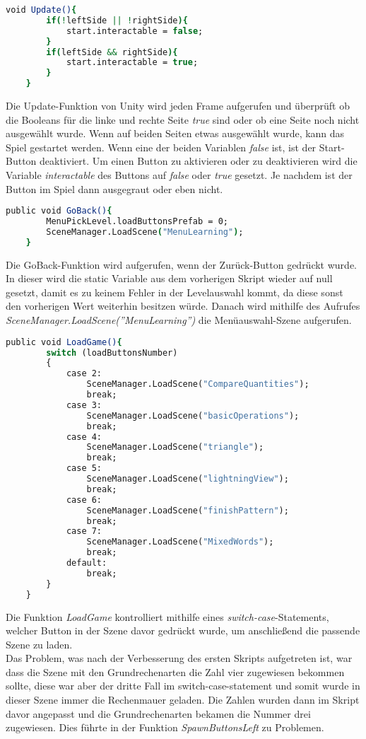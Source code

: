 \begin{lstlisting}[language=csh, caption={MenuPickLevelAdvanced.cs Update-Funktion}]
	void Update(){
		if(!leftSide || !rightSide){
			start.interactable = false;
		}
		if(leftSide && rightSide){
			start.interactable = true;
		}
	}
\end{lstlisting}
Die Update-Funktion von Unity wird jeden Frame aufgerufen und überprüft ob die Booleans für die linke und rechte Seite \textit{true} sind oder ob eine Seite noch nicht ausgewählt wurde. Wenn auf beiden Seiten etwas ausgewählt wurde, kann das Spiel gestartet werden. Wenn eine der beiden Variablen \textit{false} ist, ist der Start-Button deaktiviert. Um einen Button zu aktivieren oder zu deaktivieren wird die Variable \textit{interactable} des Buttons auf \textit{false} oder \textit{true} gesetzt. Je nachdem ist der Button im Spiel dann ausgegraut oder eben nicht.\\
\begin{lstlisting}[language=csh, caption={MenuPickLevelAdvanced.cs GoBack-Funktion}]
	public void GoBack(){
		MenuPickLevel.loadButtonsPrefab = 0;
		SceneManager.LoadScene("MenuLearning");
	}
\end{lstlisting}
Die GoBack-Funktion wird aufgerufen, wenn der Zurück-Button gedrückt wurde. In dieser wird die static Variable aus dem vorherigen Skript wieder auf null gesetzt, damit es zu keinem Fehler in der Levelauswahl kommt, da diese sonst den vorherigen Wert weiterhin besitzen würde. Danach wird mithilfe des Aufrufes \textit{SceneManager.LoadScene(''MenuLearning'')} die Menüauswahl-Szene aufgerufen.
\begin{lstlisting}[language=csh, caption={MenuPickLevelAdvanced.cs LoadGame-Funktion}]
	public void LoadGame(){
		switch (loadButtonsNumber)
		{
			case 2:
				SceneManager.LoadScene("CompareQuantities");
				break;
			case 3:
				SceneManager.LoadScene("basicOperations");
				break;
			case 4:
				SceneManager.LoadScene("triangle");
				break;
			case 5:
				SceneManager.LoadScene("lightningView");
				break;
			case 6:
				SceneManager.LoadScene("finishPattern");
				break;
			case 7:
				SceneManager.LoadScene("MixedWords");
				break;
			default:
				break;
		}
	}
\end{lstlisting}
Die Funktion \textit{LoadGame} kontrolliert mithilfe eines \textit{switch-case}-Statements, welcher Button in der Szene davor gedrückt wurde, um anschließend die passende Szene zu laden.\\
Das Problem, was nach der Verbesserung des ersten Skripts aufgetreten ist, war dass die Szene mit den Grundrechenarten die Zahl vier zugewiesen bekommen sollte, diese war aber der dritte Fall im switch-case-statement und somit wurde in dieser Szene immer die Rechenmauer geladen. Die Zahlen wurden dann im Skript davor angepasst und die Grundrechenarten bekamen die Nummer drei zugewiesen. Dies führte in der Funktion \textit{SpawnButtonsLeft} zu Problemen.\\
